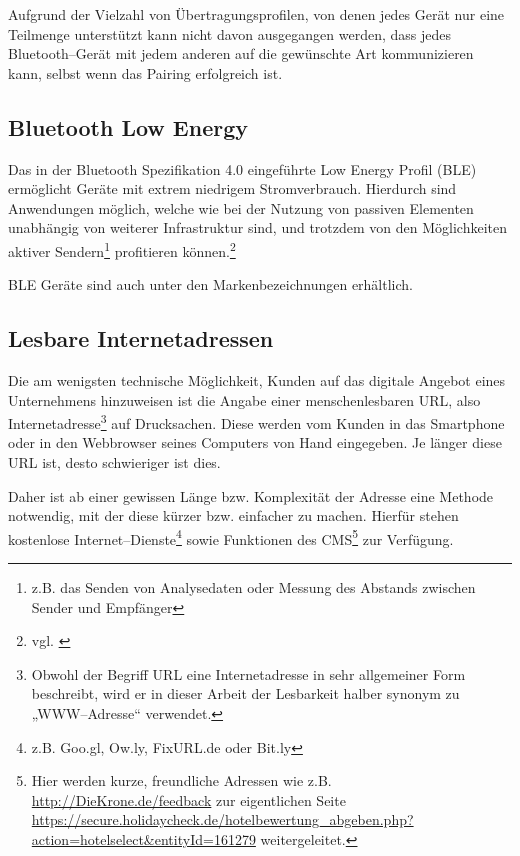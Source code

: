 Aufgrund der Vielzahl von Übertragungsprofilen, von denen jedes Gerät nur eine Teilmenge unterstützt kann nicht davon ausgegangen werden, dass jedes Bluetooth–Gerät mit jedem anderen auf die gewünschte Art kommunizieren kann, selbst wenn das Pairing erfolgreich ist.

\subsection{Bluetooth Low Energy} %
\label{sub:bluetooth_low_energy}

Das in der Bluetooth Spezifikation 4.0 eingeführte Low Energy Profil (BLE) ermöglicht Geräte mit extrem niedrigem Stromverbrauch. Hierdurch sind Anwendungen möglich, welche wie bei der Nutzung von passiven Elementen unabhängig von weiterer Infrastruktur sind, und trotzdem von den Möglichkeiten aktiver Sendern\footnote{z.B. das Senden von Analysedaten oder Messung des Abstands zwischen Sender und Empfänger} profitieren können.\footnote{vgl. \cite{bluetooth:smart}}

BLE Geräte sind auch unter den Markenbezeichnungen  erhältlich. 

\subsection{Lesbare Internetadressen} %
\label{sub:kurzlinks}
Die am wenigsten technische Möglichkeit, Kunden auf das digitale Angebot eines Unternehmens hinzuweisen ist die Angabe einer menschenlesbaren \ac{URL}, also Internetadresse\footnote{Obwohl der Begriff URL eine Internetadresse in sehr allgemeiner Form beschreibt, wird er in dieser Arbeit der Lesbarkeit halber synonym zu „WWW–Adresse“ verwendet.} auf Drucksachen. Diese werden vom Kunden in das Smartphone oder in den Webbrowser seines Computers von Hand eingegeben. Je länger diese URL ist, desto schwieriger ist dies.

Daher ist ab einer gewissen Länge bzw. Komplexität der Adresse eine Methode notwendig, mit der diese kürzer bzw. einfacher zu machen. Hierfür stehen kostenlose Internet–Dienste\footnote{z.B. Goo.gl, Ow.ly, FixURL.de oder Bit.ly} sowie Funktionen des \ac{CMS}\footnote{Hier werden kurze, freundliche Adressen wie z.B. \url{http://DieKrone.de/feedback} zur eigentlichen Seite \url{https://secure.holidaycheck.de/hotelbewertung_abgeben.php?action=hotelselect&entityId=161279} weitergeleitet.} zur Verfügung. 

